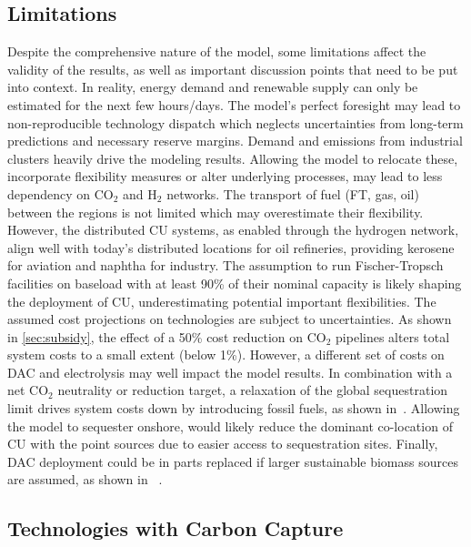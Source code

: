 \documentclass[twocolumn]{article}
\newcommand{\carbon}{CO$_2$}
\newcommand{\hydrogen}{H$_2$}
\begin{document}
\subsection{Limitations}
\label{sec:limitations}
Despite the comprehensive nature of the model, some limitations affect the validity of the results, as well as important discussion points that need to be put into context.
In reality, energy demand and renewable supply can only be estimated for the next few hours/days. The model's perfect foresight may lead to non-reproducible technology dispatch which neglects uncertainties from long-term predictions and necessary reserve margins.
Demand and emissions from industrial clusters heavily drive the modeling results. Allowing the model to relocate these, incorporate flexibility measures or alter underlying processes, may lead to less dependency on \carbon{} and \hydrogen{} networks.
The transport of fuel (FT, gas, oil) between the regions is not limited which may overestimate their flexibility. However, the distributed CU systems, as enabled through the hydrogen network, align well with today's distributed locations for oil refineries, providing kerosene for aviation and naphtha for industry. The assumption to run Fischer-Tropsch facilities on baseload with at least 90\% of their nominal capacity is likely shaping the deployment of CU, underestimating potential important flexibilities.
The assumed cost projections on technologies are subject to uncertainties. As shown in \ref{sec:subsidy}, the effect of a 50\% cost reduction on \carbon{} pipelines alters total system costs to a small extent (below 1\%). However, a different set of costs on DAC and electrolysis may well impact the model results.
In combination with a net \carbon{} neutrality or reduction target, a relaxation of the global sequestration limit drives system costs down by introducing fossil fuels, as shown in~\cite{hofmannDesigningCO2Network2023}. Allowing the model to sequester onshore, would likely reduce the dominant co-location of CU with the point sources due to easier access to sequestration sites.
Finally, DAC deployment could be in parts replaced if larger sustainable biomass sources are assumed, as shown in ~\cite{lauerCrucialRoleBioenergy2023}.

\subsection{Technologies with Carbon Capture}
\end{document}
